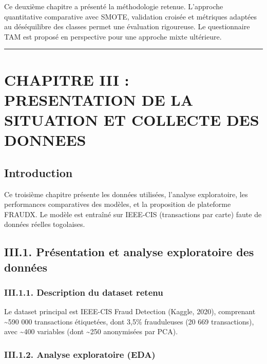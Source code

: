 \documentclass[
  12pt,
]{article}
\begin{document}
Ce deuxième chapitre a présenté la méthodologie retenue. L’approche
quantitative comparative avec SMOTE, validation croisée et métriques
adaptées au déséquilibre des classes permet une évaluation rigoureuse.
Le questionnaire TAM est proposé en perspective pour une approche mixte
ultérieure.

\begin{center}\rule{0.5\linewidth}{0.5pt}\end{center}

\section{CHAPITRE III : PRESENTATION DE LA SITUATION ET COLLECTE DES
DONNEES}\label{chapitre-iii-presentation-de-la-situation-et-collecte-des-donnees}

\subsection{Introduction}\label{introduction-2}

Ce troisième chapitre présente les données utilisées, l’analyse
exploratoire, les performances comparatives des modèles, et la
proposition de plateforme FRAUDX. Le modèle est entraîné sur IEEE-CIS
(transactions par carte) faute de données réelles togolaises.

\subsection{III.1. Présentation et analyse exploratoire des
données}\label{iii.1.-pruxe9sentation-et-analyse-exploratoire-des-donnuxe9es}

\subsubsection{III.1.1. Description du dataset
retenu}\label{iii.1.1.-description-du-dataset-retenu}

Le dataset principal est IEEE-CIS Fraud Detection (Kaggle, 2020),
comprenant \textasciitilde590 000 transactions étiquetées, dont 3,5\%
frauduleuses (20 669 transactions), avec \textasciitilde400 variables
(dont \textasciitilde250 anonymisées par PCA).

\subsubsection{III.1.2. Analyse exploratoire
(EDA)}\label{iii.1.2.-analyse-exploratoire-eda}
\end{document}
